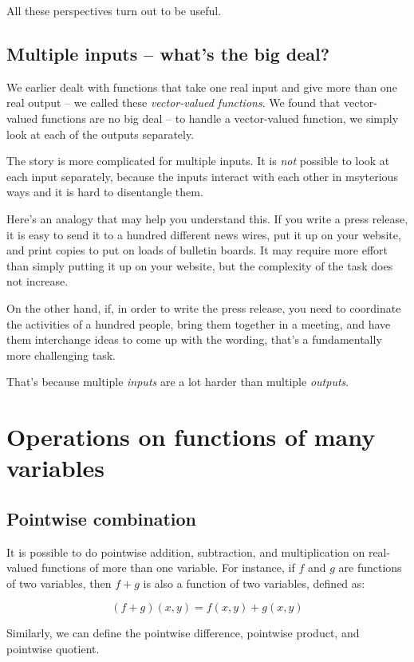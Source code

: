 \documentclass[10pt]{amsart}
\begin{document}
All these perspectives turn out to be useful.

\subsection{Multiple inputs -- what's the big deal?}

We earlier dealt with functions that take one real input and give more
than one real output -- we called these {\em vector-valued
functions}. We found that vector-valued functions are no big deal --
to handle a vector-valued function, we simply look at each of the
outputs separately.

The story is more complicated for multiple inputs. It is {\em not}
possible to look at each input separately, because the inputs interact
with each other in msyterious ways and it is hard to disentangle them.

Here's an analogy that may help you understand this. If you write a
press release, it is easy to send it to a hundred different news
wires, put it up on your website, and print copies to put on loads of
bulletin boards. It may require more effort than simply putting it up
on your website, but the complexity of the task does not increase.

On the other hand, if, in order to write the press release, you need
to coordinate the activities of a hundred people, bring them together
in a meeting, and have them interchange ideas to come up with the
wording, that's a fundamentally more challenging task.

That's because multiple {\em inputs} are a lot harder than multiple
{\em outputs}.

\section{Operations on functions of many variables}

\subsection{Pointwise combination}

It is possible to do pointwise addition, subtraction, and
multiplication on real-valued functions of more than one variable. For
instance, if $f$ and $g$ are functions of two variables, then $f + g$
is also a function of two variables, defined as:

$$(f + g)(x,y) = f(x,y) + g(x,y)$$

Similarly, we can define the pointwise difference, pointwise product,
and pointwise quotient.
\end{document}
